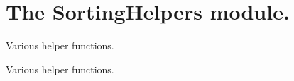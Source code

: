 \hypertarget{group__SortingHelpers}{}\section{The Sorting\+Helpers module.}
\label{group__SortingHelpers}


Various helper functions.  


Various helper functions. 

